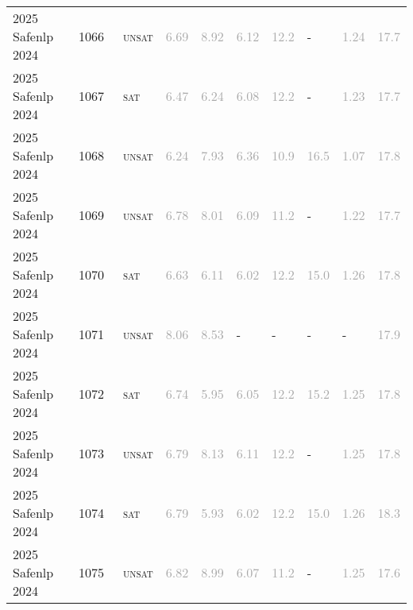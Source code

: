 \begin{center}
{\begin{longtable}{@{}llllllllll@{}}
2025 Safenlp 2024 & 1066 & ~\textsc{unsat} & \textcolor{darkgray}{6.69} & \textcolor{darkgray}{8.92} & \textcolor{darkgray}{6.12} & \textcolor{darkgray}{12.2} & - & \textcolor{darkgray}{1.24} & \textcolor{darkgray}{17.7} \\
2025 Safenlp 2024 & 1067 & ~\textsc{sat} & \textcolor{darkgray}{6.47} & \textcolor{darkgray}{6.24} & \textcolor{darkgray}{6.08} & \textcolor{darkgray}{12.2} & - & \textcolor{darkgray}{1.23} & \textcolor{darkgray}{17.7} \\
2025 Safenlp 2024 & 1068 & ~\textsc{unsat} & \textcolor{darkgray}{6.24} & \textcolor{darkgray}{7.93} & \textcolor{darkgray}{6.36} & \textcolor{darkgray}{10.9} & \textcolor{darkgray}{16.5} & \textcolor{darkgray}{1.07} & \textcolor{darkgray}{17.8} \\
2025 Safenlp 2024 & 1069 & ~\textsc{unsat} & \textcolor{darkgray}{6.78} & \textcolor{darkgray}{8.01} & \textcolor{darkgray}{6.09} & \textcolor{darkgray}{11.2} & - & \textcolor{darkgray}{1.22} & \textcolor{darkgray}{17.7} \\
2025 Safenlp 2024 & 1070 & ~\textsc{sat} & \textcolor{darkgray}{6.63} & \textcolor{darkgray}{6.11} & \textcolor{darkgray}{6.02} & \textcolor{darkgray}{12.2} & \textcolor{darkgray}{15.0} & \textcolor{darkgray}{1.26} & \textcolor{darkgray}{17.8} \\
2025 Safenlp 2024 & 1071 & ~\textsc{unsat} & \textcolor{darkgray}{8.06} & \textcolor{darkgray}{8.53} & - & - & - & - & \textcolor{darkgray}{17.9} \\
2025 Safenlp 2024 & 1072 & ~\textsc{sat} & \textcolor{darkgray}{6.74} & \textcolor{darkgray}{5.95} & \textcolor{darkgray}{6.05} & \textcolor{darkgray}{12.2} & \textcolor{darkgray}{15.2} & \textcolor{darkgray}{1.25} & \textcolor{darkgray}{17.8} \\
2025 Safenlp 2024 & 1073 & ~\textsc{unsat} & \textcolor{darkgray}{6.79} & \textcolor{darkgray}{8.13} & \textcolor{darkgray}{6.11} & \textcolor{darkgray}{12.2} & - & \textcolor{darkgray}{1.25} & \textcolor{darkgray}{17.8} \\
2025 Safenlp 2024 & 1074 & ~\textsc{sat} & \textcolor{darkgray}{6.79} & \textcolor{darkgray}{5.93} & \textcolor{darkgray}{6.02} & \textcolor{darkgray}{12.2} & \textcolor{darkgray}{15.0} & \textcolor{darkgray}{1.26} & \textcolor{darkgray}{18.3} \\
2025 Safenlp 2024 & 1075 & ~\textsc{unsat} & \textcolor{darkgray}{6.82} & \textcolor{darkgray}{8.99} & \textcolor{darkgray}{6.07} & \textcolor{darkgray}{11.2} & - & \textcolor{darkgray}{1.25} & \textcolor{darkgray}{17.6} \\

\end{longtable}}
\end{center}

